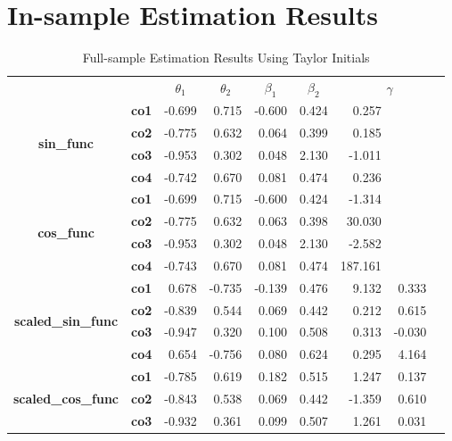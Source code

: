 \documentclass[a4paper,12pt,times,numbered,print,index]{report}
\numberwithin{equation}{section}
\begin{document}
\section{In-sample Estimation Results}
\begin{table}[htbp]
	\centering
	\caption{Full-sample Estimation Results Using Taylor Initials}
	\begin{adjustbox}{max width=0.7\textwidth}
		\begin{tabular}{ccrrrrrrr}
			\toprule
			&       & \multicolumn{1}{c}{\textbf{$\theta_{1}$}} & \multicolumn{1}{c}{\textbf{$\theta_{2}$}} & \multicolumn{1}{c}{\textbf{$\beta_1$}} & \multicolumn{1}{c}{\textbf{$\beta_2$}} & \multicolumn{3}{c}{\textbf{$\gamma$}} \\
			\multirow{4}[0]{*}{\textbf{sin\_func}} & \textbf{co1} & -0.699 & 0.715 & -0.600 & 0.424 & 0.257 &       &  \\
			& \textbf{co2} & -0.775 & 0.632 & 0.064 & 0.399 & 0.185 &       &  \\
			& \textbf{co3} & -0.953 & 0.302 & 0.048 & 2.130 & -1.011 &       &  \\
			& \textbf{co4} & -0.742 & 0.670 & 0.081 & 0.474 & 0.236 &       &  \\
			\multirow{4}[0]{*}{\textbf{cos\_func}} & \textbf{co1} & -0.699 & 0.715 & -0.600 & 0.424 & -1.314 &       &  \\
			& \textbf{co2} & -0.775 & 0.632 & 0.063 & 0.398 & 30.030 &       &  \\
			& \textbf{co3} & -0.953 & 0.302 & 0.048 & 2.130 & -2.582 &       &  \\
			& \textbf{co4} & -0.743 & 0.670 & 0.081 & 0.474 & 187.161 &       &  \\
			\multirow{4}[0]{*}{\textbf{scaled\_sin\_func}} & \textbf{co1} & 0.678 & -0.735 & -0.139 & 0.476 & 9.132 & 0.333 &  \\
			& \textbf{co2} & -0.839 & 0.544 & 0.069 & 0.442 & 0.212 & 0.615 &  \\
			& \textbf{co3} & -0.947 & 0.320 & 0.100 & 0.508 & 0.313 & -0.030 &  \\
			& \textbf{co4} & 0.654 & -0.756 & 0.080 & 0.624 & 0.295 & 4.164 &  \\
			\multirow{4}[0]{*}{\textbf{scaled\_cos\_func}} & \textbf{co1} & -0.785 & 0.619 & 0.182 & 0.515 & 1.247 & 0.137 &  \\
			& \textbf{co2} & -0.843 & 0.538 & 0.069 & 0.442 & -1.359 & 0.610 &  \\
			& \textbf{co3} & -0.932 & 0.361 & 0.099 & 0.507 & 1.261 & 0.031 &  \\

\end{tabular}
\end{adjustbox}
\end{table}
\end{document}
